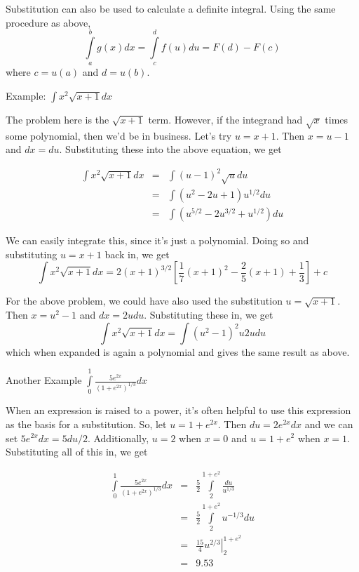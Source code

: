 \documentclass[]{book}
\theoremstyle{definition}
\theoremstyle{definition}
\theoremstyle{definition}
\theoremstyle{remark}
\begin{document}
Substitution can also be used to calculate a definite integral. Using
the same procedure as above,
\[\int\limits_a^b g(x)dx=\int\limits_c^d f(u)du = F(d)-F(c)\] where
\(c=u(a)\) and \(d=u(b)\).

Example: \(\int x^2 \sqrt{x+1}dx\)

\vspace{6pt}

The problem here is the \(\sqrt{x+1}\) term. However, if the integrand
had \(\sqrt{x}\) times some polynomial, then we'd be in business. Let's
try \(u=x+1\). Then \(x=u-1\) and \(dx=du\). Substituting these into the
above equation, we get

\begin{eqnarray}
            \int x^2\sqrt{x+1}dx&=&\int (u-1)^2\sqrt{u}du\nonumber\\
            &=&\int (u^2-2u+1)u^{1/2}du\nonumber\\
            &=&\int (u^{5/2}-2u^{3/2}+u^{1/2})du\nonumber
\end{eqnarray}

We can easily integrate this, since it's just a polynomial. Doing so and
substituting \(u=x+1\) back in, we get
\[\int x^2\sqrt{x+1}dx=2(x+1)^{3/2}\left[\frac{1}{7}(x+1)^2 -
\frac{2}{5}(x+1)+\frac{1}{3}\right]+c\]

For the above problem, we could have also used the substitution
\(u=\sqrt{x+1}\). Then \(x=u^2-1\) and \(dx=2u du\). Substituting these
in, we get \[\int x^2\sqrt{x+1}dx=\int (u^2-1)^2 u 2u du\] which when
expanded is again a polynomial and gives the same result as above.

Another Example \(\int\limits_0^1 \frac{5e^{2x}}{(1+e^{2x})^{1/3}}dx\)

\vspace{6pt}

When an expression is raised to a power, it's often helpful to use this
expression as the basis for a substitution. So, let \(u=1+e^{2x}\). Then
\(du=2e^{2x}dx\) and we can set \(5e^{2x}dx=5du/2\). Additionally,
\(u=2\) when \(x=0\) and \(u=1+e^2\) when \(x=1\). Substituting all of
this in, we get

\begin{eqnarray}
            \int\limits_0^1 \frac{5e^{2x}}{(1+e^{2x})^{1/3}}dx
            &=& \frac{5}{2}\int\limits_2^{1+e^2}\frac{du}{u^{1/3}}\nonumber\\
            &=& \frac{5}{2}\int\limits_2^{1+e^2} u^{-1/3}du\nonumber\\
            &=& \left. \frac{15}{4} u^{2/3} \right|_2^{1+e^2}\nonumber\\
            &=& 9.53\nonumber
\end{eqnarray}
\end{document}
